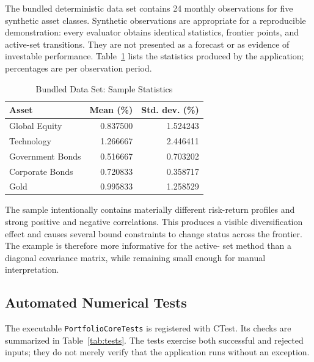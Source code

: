 \documentclass[conference]{IEEEtran}
\begin{document}
The bundled deterministic data set contains 24 monthly observations for five
synthetic asset classes. Synthetic observations are appropriate for a
reproducible demonstration: every evaluator obtains identical statistics,
frontier points, and active-set transitions. They are not presented as a
forecast or as evidence of investable performance. Table~\ref{tab:stats}
lists the statistics produced by the application; percentages are per
observation period.

\begin{table}[!t]
\caption{Bundled Data Set: Sample Statistics}
\label{tab:stats}
\centering
\footnotesize
\begin{tabular}{lrr}
\toprule
Asset & Mean (\%) & Std. dev. (\%)\\
\midrule
Global Equity    & 0.837500 & 1.524243\\
Technology       & 1.266667 & 2.446411\\
Government Bonds & 0.516667 & 0.703202\\
Corporate Bonds  & 0.720833 & 0.358717\\
Gold             & 0.995833 & 1.258529\\
\bottomrule
\end{tabular}
\end{table}

The sample intentionally contains materially different risk-return profiles
and strong positive and negative correlations. This produces a visible
diversification effect and causes several bound constraints to change status
across the frontier. The example is therefore more informative for the active-
set method than a diagonal covariance matrix, while remaining small enough for
manual interpretation.

\subsection{Automated Numerical Tests}

The executable \texttt{PortfolioCoreTests} is registered with CTest. Its
checks are summarized in Table~\ref{tab:tests}. The tests exercise both
successful and rejected inputs; they do not merely verify that the application
runs without an exception.
\end{document}
